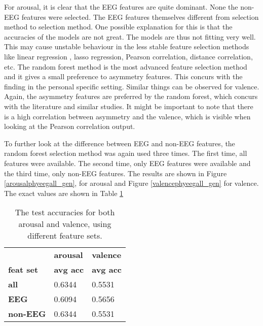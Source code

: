 For arousal, it is clear that the EEG features are quite dominant. None the non-EEG features were selected. The EEG features themselves different from selection method to selection method. One possible explanation for this is that the accuracies of the models are not great. The models are thus not fitting very well. This may cause unstable behaviour in the less stable feature selection methods like linear regression , lasso regression, Pearson correlation, distance correlation, etc. The random forest method is the most advanced feature selection method and it gives a small preference to asymmetry features. This concurs with the finding in the personal specific setting. Similar things can be observed for valence. Again, the asymmetry features are preferred by the random forest, which concurs with the literature and similar studies. It might be important to note that there is a high correlation between asymmetry and the valence, which is visible when looking at the Pearson correlation output.

\npar

To further look at the difference between EEG and non-EEG features, the random forest selection method was again used three times. The first time, all features were available. The second time, only EEG features were available and the third time, only non-EEG features. The results are shown in Figure \ref{arousalphyeegall_gen}, for arousal and Figure \ref{valencephyeegall_gen} for valence. The exact values are shown in Table \ref{phyeegallgenTable}




\begin{table}[H]
\centering
\begin{tabular}{lll}
\textbf{} & \textbf{arousal} & \textbf{valence} \\
\textbf{feat set}  & \textbf{avg acc}       & \textbf{avg acc}          \\
\textbf{all}       & 0.6344           & 0.5531           \\
\textbf{EEG}       & 0.6094           & 0.5656           \\
\textbf{non-EEG}   & 0.6344           & 0.5531          
\end{tabular}
\caption{The test accuracies for both arousal and valence, using different feature sets.\label{phyeegallgenTable}}
\end{table}

